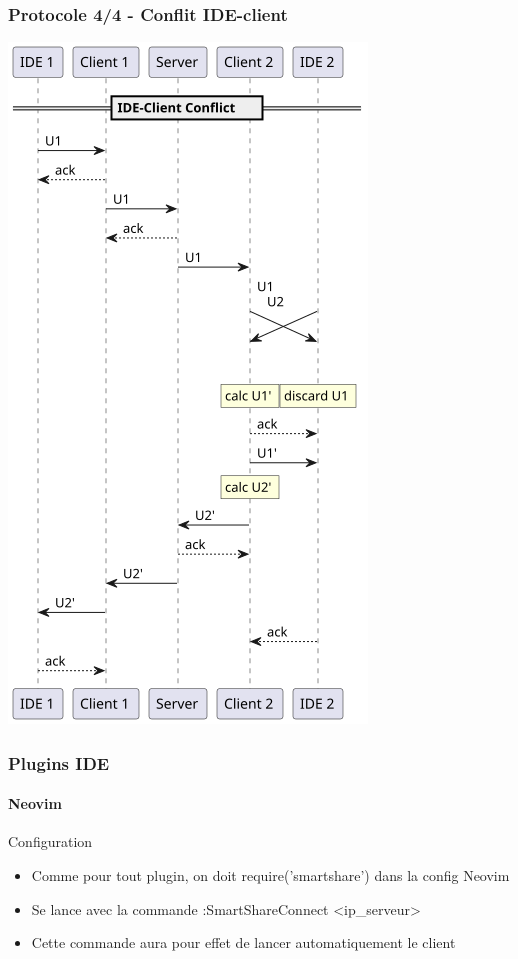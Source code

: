 \documentclass{beamer}
\begin{document}
\begin{frame}
    \frametitle{Protocole 4/4 - Conflit IDE-client}
    \includegraphics[width=\textwidth,height=0.8\textheight,keepaspectratio]{diagrams/4.png}
\end{frame}

\begin{frame}
    \frametitle{Plugins IDE}
    \framesubtitle{Neovim}
    \begin{block}{Configuration}
        \begin{itemize}
            \item Comme pour tout plugin, on doit require('smartshare') dans la config Neovim
            \item Se lance avec la commande :SmartShareConnect <ip\_serveur>
            \item Cette commande aura pour effet de lancer automatiquement le client
        \end{itemize}
    \end{block}
\end{frame}
\end{document}
